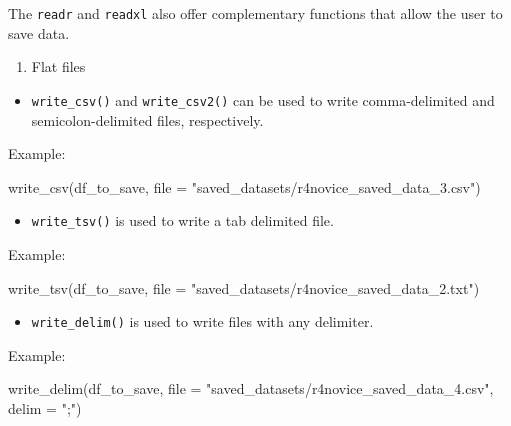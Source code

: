 \documentclass[
  letterpaper,
  DIV=11,
  numbers=noendperiod]{scrreprt}
\newenvironment{Shaded}{}{}
\newcommand{\AttributeTok}[1]{\textcolor[rgb]{0.84,0.23,0.29}{#1}}
\newcommand{\FunctionTok}[1]{\textcolor[rgb]{0.44,0.26,0.76}{#1}}
\newcommand{\NormalTok}[1]{\textcolor[rgb]{0.14,0.16,0.18}{#1}}
\newcommand{\StringTok}[1]{\textcolor[rgb]{0.01,0.18,0.38}{#1}}
\providecommand{\tightlist}{%
  \setlength{\itemsep}{0pt}\setlength{\parskip}{0pt}}\usepackage{longtable,booktabs,array}
\begin{document}
The \texttt{readr} and \texttt{readxl} also offer complementary
functions that allow the user to save data.

\begin{enumerate}
\def\labelenumi{\alph{enumi}.}
\tightlist
\item
  Flat files
\end{enumerate}

\begin{itemize}
\tightlist
\item
  \texttt{write\_csv()} and \texttt{write\_csv2()} can be used to write
  comma-delimited and semicolon-delimited files, respectively.
\end{itemize}

Example:

\begin{Shaded}
\begin{Highlighting}[]
\FunctionTok{write\_csv}\NormalTok{(df\_to\_save, }\AttributeTok{file =} \StringTok{"saved\_datasets/r4novice\_saved\_data\_3.csv"}\NormalTok{)}
\end{Highlighting}
\end{Shaded}

\begin{itemize}
\tightlist
\item
  \texttt{write\_tsv()} is used to write a tab delimited file.
\end{itemize}

Example:

\begin{Shaded}
\begin{Highlighting}[]
\FunctionTok{write\_tsv}\NormalTok{(df\_to\_save, }\AttributeTok{file =} \StringTok{"saved\_datasets/r4novice\_saved\_data\_2.txt"}\NormalTok{)}
\end{Highlighting}
\end{Shaded}

\begin{itemize}
\tightlist
\item
  \texttt{write\_delim()} is used to write files with any delimiter.
\end{itemize}

Example:

\begin{Shaded}
\begin{Highlighting}[]
\FunctionTok{write\_delim}\NormalTok{(df\_to\_save, }\AttributeTok{file =} \StringTok{"saved\_datasets/r4novice\_saved\_data\_4.csv"}\NormalTok{, }\AttributeTok{delim =} \StringTok{";"}\NormalTok{)}
\end{Highlighting}
\end{Shaded}
\end{document}
